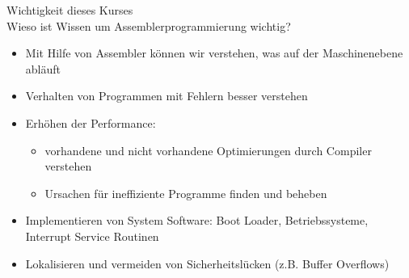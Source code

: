 \begin{example2}{Wichtigkeit dieses Kurses}\\
Wieso ist Wissen um Assemblerprogrammierung wichtig?
\begin{itemize}
  \item Mit Hilfe von Assembler können wir verstehen, was auf der Maschinenebene abläuft 
  \item Verhalten von Programmen mit Fehlern besser verstehen
  \item Erhöhen der Performance:
  \begin{itemize}
    \item vorhandene und nicht vorhandene Optimierungen durch Compiler verstehen
    \item Ursachen für ineffiziente Programme finden und beheben
  \end{itemize}
  \item Implementieren von System Software: Boot Loader, Betriebssysteme, Interrupt Service Routinen 
  \item Lokalisieren und vermeiden von Sicherheitslücken (z.B. Buffer Overflows)
\end{itemize}
\end{example2}

